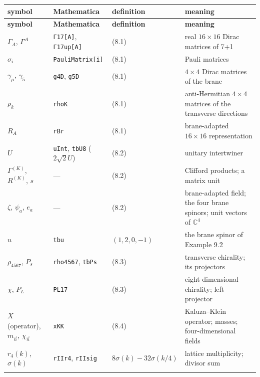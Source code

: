 \documentclass[10pt,a4paper]{article}
\begin{document}
{\footnotesize
\begin{longtable}{>{\raggedright\arraybackslash}p{}>{\raggedright\arraybackslash}p{}>{\raggedright\arraybackslash}p{}>{\raggedright\arraybackslash}p{}}
\toprule
\textbf{symbol} & \textbf{Mathematica} & \textbf{definition} & \textbf{meaning} \\
\midrule\endfirsthead
\toprule
\textbf{symbol} & \textbf{Mathematica} & \textbf{definition} & \textbf{meaning} \\
\midrule\endhead
\endfoot
\bottomrule\endlastfoot
$\Gamma_A$, $\Gamma^A$ & \texttt{Γ17[A]}, \texttt{Γ17up[A]} & (8.1) & real $16\times16$ Dirac matrices of 7+1 \\
$\sigma_i$ & \texttt{PauliMatrix[i]} & (8.1) & Pauli matrices \\
$\gamma_\mu$, $\gamma_5$ & \texttt{g4D}, \texttt{g5D} & (8.1) & $4\times4$ Dirac matrices of the brane \\
$\rho_k$ & \texttt{rhoK} & (8.1) & anti-Hermitian $4\times4$ matrices of the transverse directions \\
$R_A$ & \texttt{rBr} & (8.1) & brane-adapted $16\times16$ representation \\
$U$ & \texttt{uInt}, \texttt{tbU8} ($2\sqrt2U$) & (8.2) & unitary intertwiner \\
$\Gamma^{(K)}$, $R^{(K)}$, $s$ & — & (8.2) & Clifford products; a matrix unit \\
$\zeta$, $\psi_a$, $e_a$ & — & (8.2) & brane-adapted field; the four brane spinors; unit vectors of $\mathbb C^4$ \\
$u$ & \texttt{tbu} & $(1,2,0,-1)$ & the brane spinor of Example 9.2 \\
$\rho_{4567}$, $P_s$ & \texttt{rho4567}, \texttt{tbPs} & (8.3) & transverse chirality; its projectors \\
$\chi$, $P_L$ & \texttt{PL17} & (8.3) & eight-dimensional chirality; left projector \\
$X$ (operator), $m_{\vec n}$, $\chi_{\vec n}$ & \texttt{xKK} & (8.4) & Kaluza–Klein operator; masses; four-dimensional fields \\
$r_4(k)$, $\sigma(k)$ & \texttt{rIIr4}, \texttt{rIIsig} & $8\sigma(k)-32\sigma(k/4)$ & lattice multiplicity; divisor sum \\*
\end{longtable}}
\end{document}
